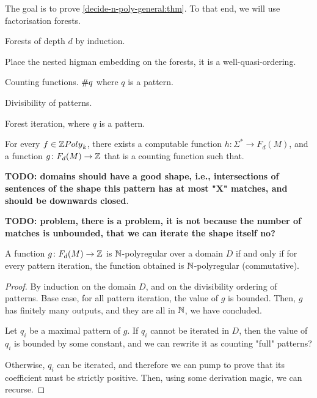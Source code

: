 The goal is to prove \cref{decide-n-poly-general:thm}.
To that end, we will use factorisation forests.
\begin{definition}
    Forests of depth $d$ by induction.
\end{definition}


\begin{remark}
    Place the nested higman embedding on the forests, it is a well-quasi-ordering.
\end{remark}

\begin{definition}
    Counting functions. ${{\#}q}$ where $q$ is a pattern.
\end{definition}

\begin{definition}
    Divisibility of patterns.
\end{definition}

\begin{definition}
    Forest iteration, where $q$ is a pattern.
\end{definition}

\begin{theorem}
    For every $f \in \ZPoly[k]$,
    there exists a computable function $h \colon \Sigma^* \to F_d(M)$,
    and a function $g \colon F_d(M) \to \mathbb{Z}$ that is a counting function
    such that.
\end{theorem}

\textbf{TODO: domains should have a good shape, i.e.,
    intersections of sentences of the shape
    this pattern has at most "X" matches, and should be
    downwards closed}.

\textbf{TODO: problem, there is a problem, it is not because
    the number of matches is unbounded, that we can
    iterate the shape itself no?}

\begin{lemma}
    A function $g \colon F_d(M) \to \mathbb{Z}$ is $\mathbb{N}$-polyregular
    over a domain $D$ if and only if for every 
    pattern iteration, the function obtained is
    $\mathbb{N}$-polyregular (commutative).
\end{lemma}
\begin{proof}
    By induction on the domain $D$, and on the divisibility ordering
    of patterns.
    Base case, for all pattern iteration, the value of $g$ is bounded.
    Then, $g$ has finitely many outputs, and they are all in $\mathbb{N}$,
    we have concluded.

    Let $q_i$ be a maximal pattern of $g$. If $q_i$ cannot be iterated in $D$,
    then the value of $q_i$ is bounded by some constant, and we can rewrite it
    as counting "full" patterns?

    Otherwise, $q_i$ can be iterated, and therefore we can
    pump to prove that its coefficient must be strictly positive.
    Then, using some derivation magic, we can recurse.
\end{proof}


